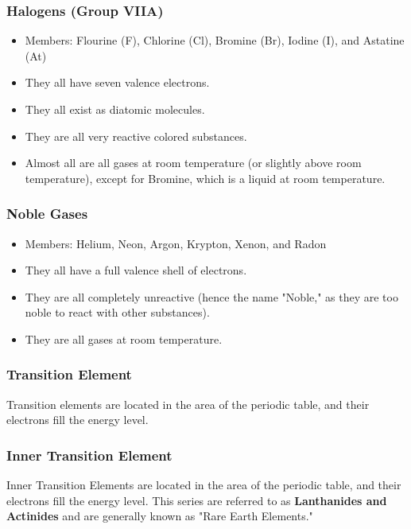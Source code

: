 \subsubsection{Halogens (Group VIIA)}

\begin{itemize}
\item Members: Flourine (F), Chlorine (Cl), Bromine (Br), Iodine (I), and Astatine (At)
\item They all have seven valence electrons.
\item They all exist as diatomic molecules.
\item They are all very reactive colored substances.
\item Almost all are all gases at room temperature (or slightly above room temperature), except for Bromine, which is a liquid at room temperature.
\end{itemize}

\subsubsection{Noble Gases}


\begin{itemize}
\item Members: Helium, Neon, Argon, Krypton, Xenon, and Radon
\item They all have a full valence shell of electrons.
\item They are all completely unreactive (hence the name "Noble," as they are too noble to react with other substances).
\item They are all gases at room temperature.
\end{itemize}

\subsubsection{Transition Element}

\begin{defn}
Transition elements are located in the  area of the periodic table, and their electrons fill the  energy level.
\end{defn}

\subsubsection{Inner Transition Element}

\begin{defn}
Inner Transition Elements are located in the  area of the periodic table, and their electrons fill the  energy level. This series are referred to as \textbf{Lanthanides and Actinides} and are generally known as "Rare Earth Elements."
\end{defn}


